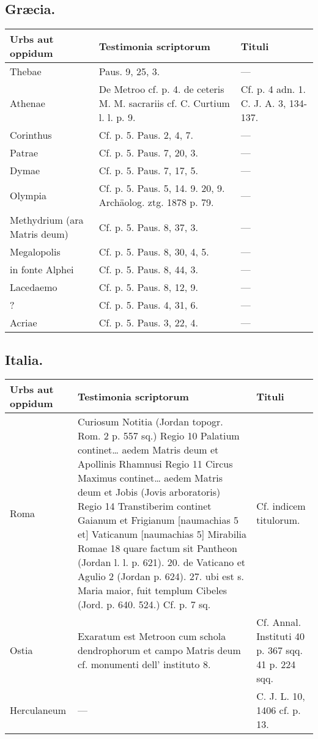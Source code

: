 \documentclass[a4paper, 11pt, oneside, polutonikogreek, german]{article}
\begin{document}
\subsection{Græcia.}
\begin{table}[H]
    \centering
    \begin{tabular}{|p{30mm}|p{20mm}|p{60mm}|}
    \hline
        Urbs aut oppidum & Testimonia scriptorum & Tituli \\ \hline
        Thebae & Paus. 9, 25, 3. & --- \\ \hline
        Athenae & De Metroo cf. p. 4. de ceteris M. M. sacrariis cf. C. Curtium l. l. p. 9. & Cf. p. 4 adn. 1. C. J. A. 3, 134-137. \\ \hline
        Corinthus & Cf. p. 5. Paus. 2, 4, 7. & --- \\ \hline
        Patrae & Cf. p. 5. Paus. 7, 20, 3. & --- \\ \hline
        Dymae & Cf. p. 5. Paus. 7, 17, 5. & --- \\ \hline
        Olympia & Cf. p. 5. Paus. 5, 14. 9. 20, 9. Archäolog. ztg. 1878 p. 79. & --- \\ \hline
        Methydrium (ara Matris deum) & Cf. p. 5. Paus. 8, 37, 3. & --- \\ \hline
        Megalopolis & Cf. p. 5. Paus. 8, 30, 4, 5. & --- \\ \hline
        in fonte Alphei & Cf. p. 5. Paus. 8, 44, 3. & --- \\ \hline
        Lacedaemo & Cf. p. 5. Paus. 8, 12, 9. & --- \\ \hline
        [Messene] ? & Cf. p. 5. Paus. 4, 31, 6. & --- \\ \hline
        Acriae & Cf. p. 5. Paus. 3, 22, 4. & --- \\ \hline
    \end{tabular}
\end{table}
\subsection{Italia.}
\begin{table}[H]
    \centering
    \begin{tabular}{|p{30mm}|p{40mm}|p{40mm}|}
    \hline
        Urbs aut oppidum & Testimonia scriptorum & Tituli \\ \hline
        Roma & Curiosum Notitia (Jordan topogr. Rom. 2 p. 557 sq.) Regio 10 Palatium continet… aedem Matris deum et Apollinis Rhamnusi Regio 11 Circus Maximus continet… aedem Matris deum et Jobis (Jovis arboratoris) Regio 14 Transtiberim continet Gaianum et Frigianum [naumachias 5 et] Vaticanum [naumachias 5] Mirabilia Romae 18 quare factum sit Pantheon (Jordan l. l. p. 621). 20. de Vaticano et Agulio 2 (Jordan p. 624). 27. ubi est s. Maria maior, fuit templum Cibeles (Jord. p. 640. 524.) Cf. p. 7 sq. & Cf. indicem titulorum. \\ \hline
        Ostia & Exaratum est Metroon cum schola dendrophorum et campo Matris deum cf. monumenti dell’ instituto 8. & Cf. Annal. Instituti 40 p. 367 sqq. 41 p. 224 sqq. \\ \hline
        Herculaneum & --- & C. J. L. 10, 1406 cf. p. 13. \\ \hline
    \end{tabular}
\end{table}
\end{document}
